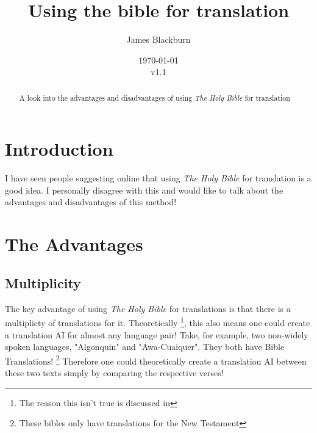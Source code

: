\documentclass{report}
\title{Using the bible for translation}
\author{James Blackburn}
\date {\today\\v1.1}
\newcommand{\bible}{{\emph{The Holy Bible }}}
\begin{document}
\maketitle

\begin{abstract}
    A look into the advantages and disadvantages of using \bible for translation
\end{abstract}

\section{Introduction}
I have seen people suggesting online that using \bible for translation is a good idea.\cite{livemintwebsite} I personally disagree with this and would like to talk about the advantages and disadvantages of this method!

\section{The Advantages}
\subsection{Multiplicity}
The key advantage of using \bible for translations is that there is a multiplicty of translations for it. \cite{ebibledownload,crosswiremodules}
Theoretically \footnote{The reason this isn't true is discussed in }, this also means one could create a translation AI for almost any language pair! 
Take, for example, two non-widely spoken languages, "Algonquin" and "Awa-Cuaiquer". They both have Bible Translations!\cite{algonquinbible,awabible} \footnote{These bibles only have translations for the New Testament}
Therefore one could theoretically create a translation AI between these two texts simply by comparing the respective verses!
\end{document}
